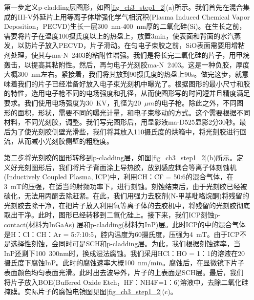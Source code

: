 第一步定义p-cladding层图形，如图\ref{fig_ch3_step1_2}(a)所示。我们首先在混合集成的III-V外延片上用等离子体增强化学气相沉积(Plasma Induced Chemical Vapor Deposition，PECVD)生长一层300~nm-400~nm厚的二氧化硅(Si)。在生长之前，需要将片子在温度100摄氏度以上的热盘上，放置3min，使表面和背面的水汽蒸发，以防片子放入PECVD，片子滑动。在匀电子束胶之前，SiO表面需要用增粘剂处理，使其与ma-N~2403的粘附性增强。我们是将长完二氧化硅的片子，用甲烷轰击，以提高其粘附性。然后，再匀电子光刻胶ma-N~2403\cite{man2403}。这是一种负胶，厚度大概300~nm左右。紧接着，我们将其放到90摄氏度的热盘上90s。做完这步，就意味着我们的片子已经准备好放入电子束光刻机中曝光了。根据图形的最小尺寸和胶的特性，选用电子枪不同的电场强度和孔径，从而使图形写的时间短并且精度满足要求。我们使用电场强度为30~KV，孔径为20~$\mu m$的电子枪。除此之外，不同图形的面积，形状，需要不同的曝光计量，和电子束移动的方式。这个需要根据不同材料，不同光刻胶，调整。我们写完图形后，用显影液ma-D525显影2分30秒。最后为了使光刻胶侧壁光滑些，我们将其放入110摄氏度的烘箱中，将光刻胶进行回流，从而减小光刻胶侧壁的粗糙度。

第二步将光刻胶的图形转移到p-cladding层，如图\ref{fig_ch3_step1_2}(b)所示。定义好光刻图形后，我们将片子背面涂上导热胶，放到感应耦合等离子体刻蚀机(Inductively Coupled Plasma, ICP)中，利用CH：CF = 50:6的混合气体，在3~mT的压强，在适当的射频功率下，进行刻蚀。刻蚀结束后，由于光刻胶已经被碳化，无法用丙酮去除赶紧。在此，我们用强力去胶剂(N-甲基吡咯烷酮)将残留的光刻胶去除干净，在把片子放入利用氧等离子体的去胶机中，将残留的光刻胶彻底取出干净。此时，图形已经转移到二氧化硅上。接下来，我们ICP刻蚀p-contact(材料为InGaAs) 层和p-cladding(材料为InP)层。此时ICP的中的混合气体是H：Cl：CH：Ar = 5:7:10:5，腔内温度为60摄氏度，压强为4~mT。由于ICP不是选择性刻蚀，会同时可是SCH和p-cladding层。为此，我们根据刻蚀速率，当InP还剩下100~300nm时，换成湿法腐蚀。我们采用HCl：HO = 1：1的溶液在20摄氏度下腐蚀InP。此时的腐蚀速率大概100~nm/min。腐蚀后，在显微镜下片子表面颜色均匀表面光滑。此时出去波导外，片子的上表面是SCH层。最后，我们将片子放入BOE(Buffered Oxide Etch，HF：NH4F=1：6)溶液中，去除二氧化硅掩膜。实际片子的腐蚀电镜图见图\ref{fig_ch3_step1_2}(c)。

